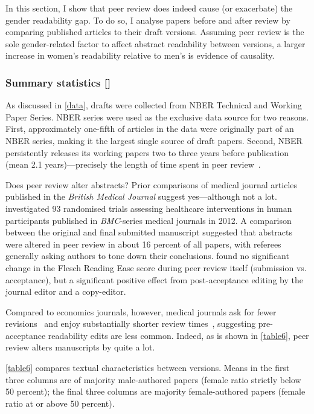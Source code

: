 In this section, I show that peer review does indeed cause (or exacerbate) the gender readability gap. To do so, I analyse papers before and after review by comparing published articles to their draft versions. Assuming peer review is the sole gender-related factor to affect abstract readability between versions, a larger increase in women's readability relative to men's is evidence of causality.

\subsubsection{Summary statistics []}
\label{summarystatistics}

As discussed in \autoref{data}, drafts were collected from NBER Technical and Working Paper Series. NBER series were used as the exclusive data source for two reasons. First, approximately one-fifth of articles in the data were originally part of an NBER series, making it the largest single source of draft papers. Second, NBER persistently releases its working papers two to three years before publication (mean 2.1 years)---precisely the length of time spent in peer review~\citep{Ellison2002a,Goldberg2015}.

Does peer review alter abstracts? Prior comparisons of medical journal articles published in the \emph{British Medical Journal} suggest yes---although not a lot.  \citet{Hopewell2014} investigated 93 randomised trials assessing healthcare interventions in human participants published in \emph{BMC}-series medical journals in 2012. A comparison between the original and final submitted manuscript suggested that abstracts were altered in peer review in about 16 percent of all papers, with referees generally asking authors to tone down their conclusions.  \citet{Hayden2008} found no significant change in the Flesch Reading Ease score during peer review itself (submission vs. acceptance), but a significant positive effect from post-acceptance editing by the journal editor and a copy-editor.

Compared to economics journals, however, medical journals ask for fewer revisions~\citep{Ellison2002a,Hayden2008} and enjoy substantially shorter review times~\citep[see, \emph{e.g.},][]{Trauma2015}, suggesting pre-acceptance readability edits are less common. Indeed, as is shown in \autoref{table6}, peer review alters manuscripts by quite a lot.

\autoref{table6} compares textual characteristics between versions. Means in the first three columns are of majority male-authored papers (female ratio strictly below 50 percent); the final three columns are majority female-authored papers (female ratio at or above 50 percent).

